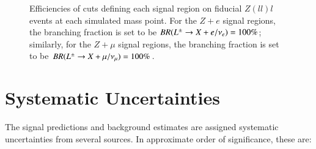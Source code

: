 \begin{figure}[htb]
{	}
	\caption{Efficiencies of cuts defining each signal region on fiducial $Z(ll)l$ events at each simulated mass point. For the $Z+e$ signal regions, the branching fraction is set to be $BR(L^{\pm}\rightarrow X+e/\nu_{e})=100\%$; similarly, for the $Z+\mu$ signal regions, the branching fraction is set to be $BR(L^{\pm}\rightarrow X+\mu/\nu_{\mu})=100\%$.}
	\label{fig:fiducial-efficiencies-vs-mass}
\end{figure}


\clearpage

\section{Systematic Uncertainties}\label{sec:resonance-systematic-uncertainties}
The signal predictions and background estimates are assigned systematic uncertainties from several sources. In approximate order of significance, these are:

